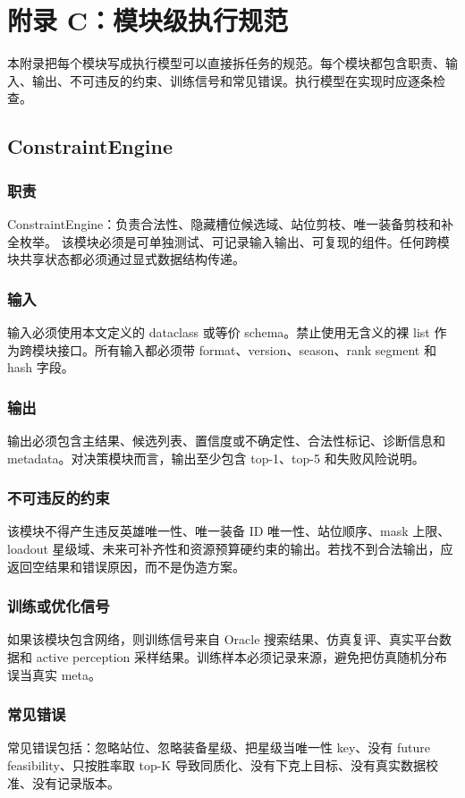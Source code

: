 \documentclass[UTF8,12pt,openany]{ctexbook}
\begin{document}
\chapter{附录 C：模块级执行规范}

本附录把每个模块写成执行模型可以直接拆任务的规范。每个模块都包含职责、输入、输出、不可违反的约束、训练信号和常见错误。执行模型在实现时应逐条检查。

\section{ConstraintEngine}
\subsection{职责}
ConstraintEngine：负责合法性、隐藏槽位候选域、站位剪枝、唯一装备剪枝和补全枚举。 该模块必须是可单独测试、可记录输入输出、可复现的组件。任何跨模块共享状态都必须通过显式数据结构传递。

\subsection{输入}
输入必须使用本文定义的 dataclass 或等价 schema。禁止使用无含义的裸 list 作为跨模块接口。所有输入都必须带 format、version、season、rank segment 和 hash 字段。

\subsection{输出}
输出必须包含主结果、候选列表、置信度或不确定性、合法性标记、诊断信息和 metadata。对决策模块而言，输出至少包含 top-1、top-5 和失败风险说明。

\subsection{不可违反的约束}
该模块不得产生违反英雄唯一性、唯一装备 ID 唯一性、站位顺序、mask 上限、loadout 星级域、未来可补齐性和资源预算硬约束的输出。若找不到合法输出，应返回空结果和错误原因，而不是伪造方案。

\subsection{训练或优化信号}
如果该模块包含网络，则训练信号来自 Oracle 搜索结果、仿真复评、真实平台数据和 active perception 采样结果。训练样本必须记录来源，避免把仿真随机分布误当真实 meta。

\subsection{常见错误}
常见错误包括：忽略站位、忽略装备星级、把星级当唯一性 key、没有 future feasibility、只按胜率取 top-K 导致同质化、没有下克上目标、没有真实数据校准、没有记录版本。
\end{document}
